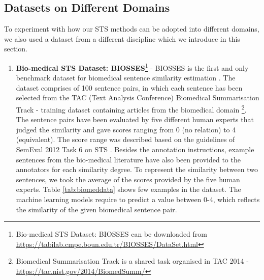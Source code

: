 \subsection{Datasets on Different Domains}
To experiment with how our STS methods can be adopted into different domains, we also used a dataset from a different discipline which we introduce in this section. 
\begin{enumerate}
	
	\item{ \textbf{Bio-medical STS Dataset: BIOSSES}\footnote{Bio-medical STS Dataset: BIOSSES  can be downloaded from \url{https://tabilab.cmpe.boun.edu.tr/BIOSSES/DataSet.html} }} - BIOSSES is the first and only benchmark dataset for biomedical sentence similarity estimation \autocite{10.1093/bioinformatics/btx238}. The dataset comprises of 100 sentence pairs, in which each sentence has been selected from the TAC (Text Analysis Conference) Biomedical Summarisation Track - training dataset containing articles from the biomedical domain \footnote{Biomedical Summarisation Track is a shared task organised in TAC 2014 - \url{https://tac.nist.gov/2014/BiomedSumm/}}. The sentence pairs have been evaluated by five different human experts that judged the similarity and gave scores ranging from 0 (no relation) to 4 (equivalent). The score range was described based on the guidelines of SemEval 2012 Task 6 on STS \autocite{agirre-etal-2012-semeval}. Besides the annotation instructions, example sentences from the bio-medical literature have also been provided to the annotators for each similarity degree. To represent the similarity between two sentences, we took the average of the scores provided by the five human experts. Table \ref{tab:biomeddata} shows few examples in the dataset. The machine learning models require to predict a value between 0-4, which reflects the similarity of the given biomedical sentence pair.
	


\end{enumerate}
